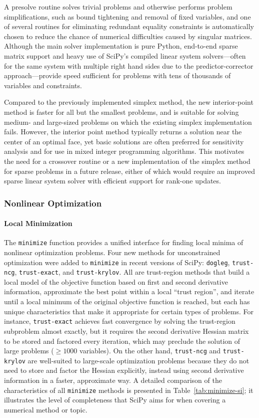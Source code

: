\documentclass[fleqn,10pt]{wlscirep}
\begin{document}
A presolve routine \cite{andersen1995presolving} solves trivial problems and otherwise performs problem simplifications, such as bound tightening and removal of fixed variables, and one of several routines for eliminating redundant equality constraints is automatically chosen to reduce the chance of numerical difficulties caused by singular matrices. Although the main solver implementation is pure Python, end-to-end sparse matrix support and heavy use of SciPy's compiled linear system solvers---often for the same system with multiple right hand sides due to the predictor-corrector approach---provide speed sufficient for problems with tens of thousands of variables and constraints.

Compared to the previously implemented simplex method, the new interior-point method is faster for all but the smallest problems, and is suitable for solving medium- and large-sized problems on which the existing simplex implementation fails. However, the interior point method typically returns a solution near the center of an optimal face, yet basic solutions are often preferred for sensitivity analysis and for use in mixed integer programming algorithms. This motivates the need for a crossover routine or a new implementation of the simplex method for sparse problems in a future release, either of which would require an improved sparse linear system solver with efficient support for rank-one updates.

\subsubsection*{Nonlinear Optimization}
\paragraph{Local Minimization}
The \texttt{minimize} function provides a unified interface for finding local minima of nonlinear optimization problems. Four new methods for unconstrained optimization were added to \texttt{minimize} in recent versions of SciPy: \texttt{dogleg}, \texttt{trust-ncg}, \texttt{trust-exact}, and \texttt{trust-krylov}. All are trust-region methods that build a local model of the objective function based on first and second derivative information, approximate the best point within a local ``trust region'', and iterate until a local minimum of the original objective function is reached, but each has unique characteristics that make it appropriate for certain types of problems. For instance, \texttt{trust-exact} achieves fast convergence by solving the trust-region subproblem almost exactly, but it requires the second derivative Hessian matrix to be stored and factored every iteration, which may preclude the solution of large problems ($\geq 1000$ variables). On the other hand, \texttt{trust-ncg} and \texttt{trust-krylov} are well-suited to large-scale optimization problems because they do not need to store and factor the Hessian explicitly, instead using second derivative information in a faster, approximate way. A detailed comparison of the characteristics of all \texttt{minimize} methods is presented in Table~\ref{tab:minimize-si}; it illustrates the level of completeness that SciPy aims for when covering a numerical method or topic.
\end{document}
